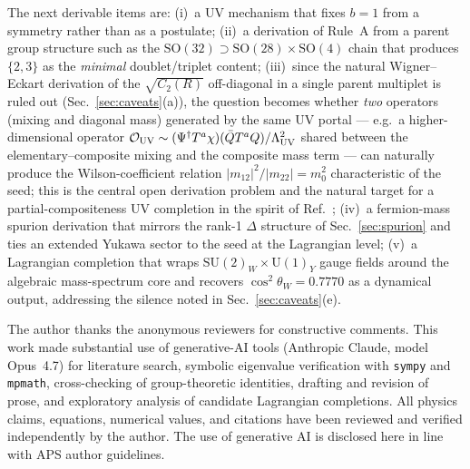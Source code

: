 \documentclass[%
 aps,
 prd,
 reprint,
 nofootinbib,
 superscriptaddress,
 amsmath,
 amssymb,
]{revtex4-2}
\begin{document}
The next derivable items are: (i)~a UV mechanism that fixes $b=1$ from a symmetry rather than as a postulate; (ii)~a derivation of Rule~A from a parent group structure such as the $\mathrm{SO}(32)\supset\mathrm{SO}(28)\times\mathrm{SO}(4)$ chain that produces $\{2,3\}$ as the \emph{minimal} doublet/triplet content; (iii)~since the natural Wigner--Eckart derivation of the $\sqrt{C_2(R)}$ off-diagonal in a single parent multiplet is ruled out (Sec.~\ref{sec:caveats}(a)), the question becomes whether \emph{two} operators (mixing and diagonal mass) generated by the same UV portal --- e.g.\ a higher-dimensional operator $\mathcal{O}_{\rm UV}\sim(\Psi^\dagger T^a\chi)(\bar Q T^a Q)/\Lambda_{\rm UV}^2$ shared between the elementary--composite mixing and the composite mass term --- can naturally produce the Wilson-coefficient relation $|m_{12}|^2/|m_{22}| = m_0^2$ characteristic of the seed; this is the central open derivation problem and the natural target for a partial-compositeness UV completion in the spirit of Ref.~\cite{Caracciolo2013PC}; (iv)~a fermion-mass spurion derivation that mirrors the rank-1 $\Delta$ structure of Sec.~\ref{sec:spurion} and ties an extended Yukawa sector to the seed at the Lagrangian level; (v)~a Lagrangian completion that wraps $\mathrm{SU}(2)_W\times\mathrm{U}(1)_Y$ gauge fields around the algebraic mass-spectrum core and recovers $\cos^2\theta_W=0.7770$ as a dynamical output, addressing the silence noted in Sec.~\ref{sec:caveats}(e).

\begin{acknowledgments}
The author thanks the anonymous reviewers for constructive comments. This work made substantial use of generative-AI tools (Anthropic Claude, model Opus~4.7) for literature search, symbolic eigenvalue verification with \texttt{sympy} and \texttt{mpmath}, cross-checking of group-theoretic identities, drafting and revision of prose, and exploratory analysis of candidate Lagrangian completions. All physics claims, equations, numerical values, and citations have been reviewed and verified independently by the author. The use of generative AI is disclosed here in line with APS author guidelines.
\end{acknowledgments}
\end{document}
